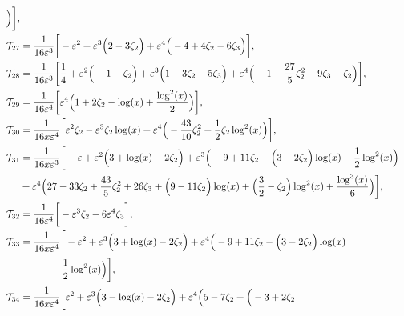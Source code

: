 \begin{align}
\Big)
% 
\bigg],
% 
\nonumber\\
% 
\mi_{27} &=   \frac{1}{16 \ep^3}  \bigg[
% 
-\ep^2
+\ep^3 \Big(
        2
        -3 \zeta_2
\Big)
+\ep^4 \Big(
        -4
        +4 \zeta_2
        -6 \zeta_3
\Big)
% 
\bigg],
% 
\nonumber\\
% 
\mi_{28} &=   \frac{1}{16 \ep^3}  \bigg[
% 
\frac{1}{4}
+\ep^2 \Big(
        -1
        -\zeta_2
\Big)
+\ep^3 \Big(
        1
        -3 \zeta_2
        -5 \zeta_3
\Big)
+\ep^4 \Big(
        -1
        -\frac{27}{5} \zeta_2^2
        -9 \zeta_3
        +\zeta_2
\Big)
% 
\bigg],
% 
\nonumber\\
% 
\mi_{29} &=   \frac{1}{16 \ep^4}  \bigg[
% 
\ep^4 \Big(
        1
        +2 \zeta_2
        -\log (x)
        +\frac{\log ^2(x)}{2}
\Big)
% 
\bigg],
% 
\nonumber\\
% 
\mi_{30} &=   \frac{1}{16 x \ep^4}  \bigg[
% 
 \ep^2 \zeta_2
-\ep^3 \zeta_2 \log (x)
+\ep^4 \Big(
        -\frac{43}{10} \zeta_2^2
        +\frac{1}{2} \zeta_2 \log ^2(x)
\Big)
% 
\bigg],
%
\nonumber\\
% 
\mi_{31} &=   \frac{1}{16 x \ep^3}  \bigg[
% 
-\ep
+\ep^2 \Big(
        3
        +\log (x)
        -2 \zeta_2
\Big)
+\ep^3 \Big(
        -9
        +11 \zeta_2
        -\Big(
                 3
                -2 \zeta_2
        \Big) \log (x)
        -\frac{1}{2} \log ^2(x)
\Big)
\nonumber\\& 
+\ep^4 \Big(
        27
        -33 \zeta_2
        +\frac{43}{5} \zeta_2^2
        +26 \zeta_3
        +\Big(
                9
                -11 \zeta_2
        \Big) \log (x)
        +\Big(
                \frac{3}{2}
                -\zeta_2
        \Big) \log ^2(x)
        +\frac{\log ^3(x)}{6}
\Big)
% 
\bigg],
%
\nonumber\\
% 
\mi_{32} &=   \frac{1}{16 \ep^4}  \bigg[
% 
-\ep^3 \zeta_2
-6 \ep^4 \zeta_3
% 
\bigg],
%
\nonumber\\
% 
\mi_{33} &=   \frac{1}{16 x \ep^4}  \bigg[
% 
-\ep^2
+\ep^3 \Big(
        3
        +\log (x)
        -2 \zeta_2
\Big)
+\ep^4 \Big(
        -9
        +11 \zeta_2
        -\Big(
                 3
                -2 \zeta_2
        \Big) \log (x)
\nonumber\\& \qquad \quad        
        -\frac{1}{2} \log ^2(x)
\Big)
% 
\bigg],
%
\nonumber\\
% 
\mi_{34} &=   \frac{1}{16 x \ep^4}  \bigg[
% 
\ep^2
+\ep^3 \Big(
        3
        -\log (x)
        -2 \zeta_2
\Big)
+\ep^4 \Big(
        5
        -7 \zeta_2
        +\Big(
                -3
                +2 \zeta_2

\end{align}
